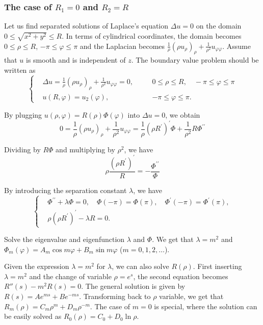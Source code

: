 \subsubsection{The case of $R_1 = 0$ and $R_2 = R$}
Let us find separated solutions of Laplace's equation $\Delta u = 0$ on the domain $0 \leq \sqrt{x^2+y^2} \leq R$. In terms of cylindrical coordinates, the domain becomes $0\le \rho \le R$, $-\pi \leq \varphi \leq \pi$ and the Laplacian becomes $\frac{1}{\rho} ( \rho u_\rho)_\rho + \frac{1}{\rho^2} u_{\varphi\varphi}$. Assume that $u$ is smooth and is independent of $z$. The boundary value problem should be written as
\begin{equation}\label{eq.boundary_value_cylindrical_disk}
\left\{\begin{aligned}
    &\Delta u = \frac{1}{\rho} ( \rho u_\rho)_\rho + \frac{1}{\rho^2} u_{\varphi\varphi} = 0, \quad && 0\leq \rho \leq R, \quad -\pi \leq \varphi \leq \pi
    \\
    &u(R, \varphi)=u_2(\varphi), && -\pi \leq \varphi \leq \pi. 
\end{aligned}\right.
\end{equation}

By plugging $u(\rho, \varphi)=R(\rho) \Phi(\varphi)$ into $\Delta u=0$, we obtain
$$
0=\frac{1}{\rho} ( \rho u_\rho)_\rho+\frac{1}{\rho^2} u_{\varphi \varphi}=\frac{1}{\rho}(\rho R^{\prime})^{\prime} \Phi+\frac{1}{\rho^2} R \Phi^{\prime \prime}
$$

Dividing by $R \Phi$ and multiplying by $\rho^2$, we have
$$
\rho \frac{(\rho R^{\prime})^{\prime}}{R} = - \frac{\Phi^{\prime \prime}}{\Phi}
$$


By introducing the separation constant $\lambda$, we have
\begin{equation}\label{eq.Laplace_separation_var}
\left\{\begin{aligned}
    &\Phi^{\prime \prime}+\lambda \Phi=0, \quad \Phi(-\pi)=\Phi(\pi), \quad \Phi^{\prime}(-\pi)=\Phi^{\prime}(\pi), 
    \\
    &\rho (\rho R^{\prime})^{\prime} - \lambda R = 0.
\end{aligned}
\right.
\end{equation}

Solve the eigenvalue and eigenfunction $\lambda$ and $\Phi$. We get that $\lambda=m^2$ and $\Phi_m(\varphi)=A_m \cos m \varphi+B_m \sin m \varphi$ ($m=0,1,2, \ldots$). 

Given the expression $\lambda=m^2$ for $\lambda$, we can also solve $R(\rho)$. First inserting $\lambda=m^2$ and the change of variable $\rho = e^s$, the second equation becomes $R''(s) - m^2 R(s) = 0$. The general solution is given by $R(s) = Ae^{ms} + Be^{-ms}$. Transforming back to $\rho$ variable, we get that $R_m(\rho) = C_m\rho^m + D_m\rho^{-m}$. The case of $m = 0$ is special, where the solution can be easily solved as $R_0(\rho) = C_0+D_0 \ln \rho$.

